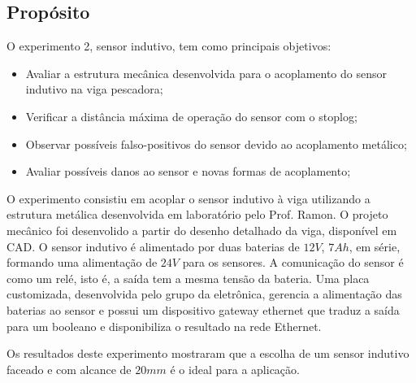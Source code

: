 
 

\subsection{Propósito}
O experimento 2, sensor indutivo, tem como principais objetivos:
 \begin{itemize}
 \item Avaliar a estrutura mecânica desenvolvida para o acoplamento do sensor
 indutivo na viga pescadora;
 \item Verificar a distância máxima de operação do sensor com o stoplog;
 \item Observar possíveis falso-positivos do sensor devido ao acoplamento
 metálico;
 \item Avaliar possíveis danos ao sensor e novas formas de acoplamento;
 \end{itemize}
\label{proposito}
O experimento consistiu em acoplar o sensor indutivo à viga utilizando a
estrutura metálica desenvolvida em laboratório pelo Prof. Ramon. O projeto
mecânico foi desenvolido a partir do desenho detalhado da viga,
disponível em CAD.
O sensor indutivo é alimentado por duas baterias de $12V$, $7Ah$, em série, formando uma alimentação de $24V$ para
os sensores. A comunicação do sensor é como um relé, isto é, a saída tem a mesma
tensão da bateria. Uma placa customizada, desenvolvida pelo grupo da eletrônica,
gerencia a alimentação das baterias ao sensor e possui um
dispositivo gateway ethernet que traduz a saída para um booleano e
disponibiliza o resultado na rede Ethernet.

Os resultados deste experimento mostraram que a escolha de um sensor indutivo
faceado e com alcance de $20mm$ é o ideal para a aplicação.
